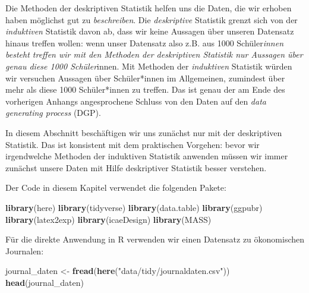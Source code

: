 \documentclass[]{book}
\newenvironment{Shaded}{\begin{snugshade}}{\end{snugshade}}
\newcommand{\KeywordTok}[1]{\textcolor[rgb]{0.13,0.29,0.53}{\textbf{#1}}}
\newcommand{\StringTok}[1]{\textcolor[rgb]{0.31,0.60,0.02}{#1}}
\newcommand{\NormalTok}[1]{#1}
\begin{document}
Die Methoden der deskriptiven Statistik helfen uns die Daten, die wir
erhoben haben möglichst gut zu \emph{beschreiben}. Die
\emph{deskriptive} Statistik grenzt sich von der \emph{induktiven}
Statistik davon ab, dass wir keine Aussagen über unseren Datensatz
hinaus treffen wollen: wenn unser Datensatz also z.B. aus 1000
Schüler\emph{innen besteht treffen wir mit den Methoden der deskriptiven
Statistik nur Aussagen über genau diese 1000 Schüler}innen. Mit Methoden
der \emph{induktiven} Statistik würden wir versuchen Aussagen über
Schüler*innen im Allgemeinen, zumindest über mehr als diese 1000
Schüler*innen zu treffen. Das ist genau der am Ende des vorherigen
Anhangs angesprochene Schluss von den Daten auf den \emph{data
generating process} (DGP).

In diesem Abschnitt beschäftigen wir uns zunächst nur mit der
deskriptiven Statistik. Das ist konsistent mit dem praktischen Vorgehen:
bevor wir irgendwelche Methoden der induktiven Statistik anwenden müssen
wir immer zunächst unsere Daten mit Hilfe deskriptiver Statistik besser
verstehen.

Der Code in diesem Kapitel verwendet die folgenden Pakete:

\begin{Shaded}
\begin{Highlighting}[]
\KeywordTok{library}\NormalTok{(here)}
\KeywordTok{library}\NormalTok{(tidyverse)}
\KeywordTok{library}\NormalTok{(data.table)}
\KeywordTok{library}\NormalTok{(ggpubr)}
\KeywordTok{library}\NormalTok{(latex2exp)}
\KeywordTok{library}\NormalTok{(icaeDesign)}
\KeywordTok{library}\NormalTok{(MASS)}
\end{Highlighting}
\end{Shaded}

Für die direkte Anwendung in R verwenden wir einen Datensatz zu
ökonomischen Journalen:

\begin{Shaded}
\begin{Highlighting}[]
\NormalTok{journal_daten <-}\StringTok{ }\KeywordTok{fread}\NormalTok{(}\KeywordTok{here}\NormalTok{(}\StringTok{"data/tidy/journaldaten.csv"}\NormalTok{))}
\KeywordTok{head}\NormalTok{(journal_daten)}
\end{Highlighting}
\end{Shaded}
\end{document}
